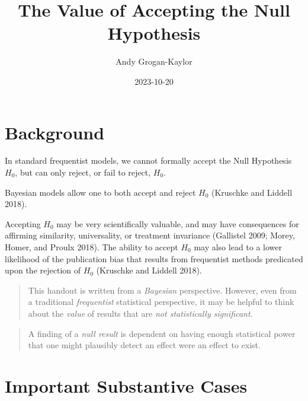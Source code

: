 \documentclass[
  letterpaper,
  DIV=11,
  numbers=noendperiod]{scrartcl}
\title{The Value of Accepting the Null Hypothesis}
\author{Andy Grogan-Kaylor}
\date{2023-10-20}
\renewcommand*\contentsname{Table of contents}
\newcommand\contentsname{Table of contents}
\begin{document}
\maketitle
\ifdefined\Shaded\renewenvironment{Shaded}{\begin{tcolorbox}[frame hidden, breakable, sharp corners, borderline west={3pt}{0pt}{shadecolor}, interior hidden, boxrule=0pt, enhanced]}{\end{tcolorbox}}\fi

\renewcommand*\contentsname{Table of contents}
{
\hypersetup{linkcolor=}
\setcounter{tocdepth}{3}
\tableofcontents
}
\hypertarget{background}{%
\section{Background}\label{background}}

In standard frequentist models, we cannot formally accept the Null
Hypothesis \(H_0\), but can only reject, or fail to reject, \(H_0\).

Bayesian models allow one to both accept and reject \(H_0\) (Kruschke
and Liddell 2018).

Accepting \(H_0\) may be very scientifically valuable, and may have
consequences for affirming similarity, universality, or treatment
invariance (Gallistel 2009; Morey, Homer, and Proulx 2018). The ability
to accept \(H_0\) may also lead to a lower likelihood of the publication
bias that results from frequentist methods predicated upon the rejection
of \(H_0\) (Kruschke and Liddell 2018).

\begin{quote}
This handout is written from a \emph{Bayesian} perspective. However,
even from a traditional \emph{frequentist} statistical perspective, it
may be helpful to think about the \emph{value} of results that are
\emph{not statistically significant}.
\end{quote}

\begin{quote}
A finding of a \emph{null result} is dependent on having enough
statistical power that one might plausibly detect an effect were an
effect to exist.
\end{quote}

\newpage{}

\hypertarget{important-substantive-cases}{%
\section{Important Substantive
Cases}\label{important-substantive-cases}}
\end{document}
